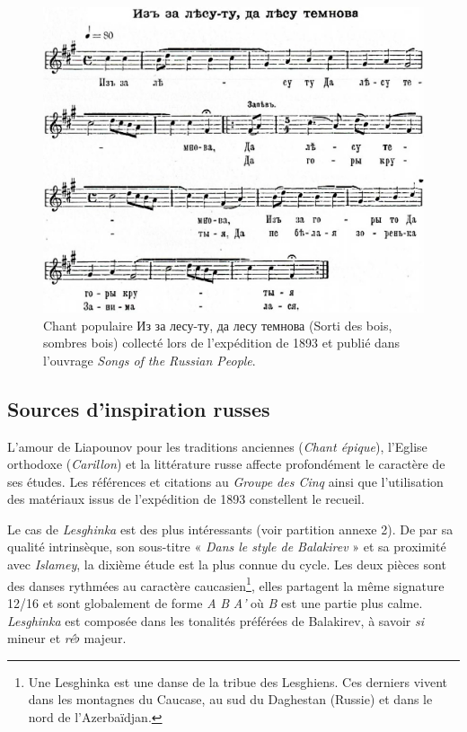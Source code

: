 \begin{figure}[!ht]
  \begin{bigcenter}
    \includegraphics[width=12.75cm, keepaspectratio]{woods.png}
  \end{bigcenter}
  \caption{\label{woods}Chant populaire \foreignlanguage{russian}{Из за лесу-ту, да лесу темнова} (Sorti des bois, sombres bois) collecté lors de l'expédition de 1893 et publié dans l'ouvrage \emph{Songs of the Russian People}.}
\end{figure}

\subsection{Sources d'inspiration russes}

L'amour de Liapounov pour les traditions anciennes (\emph{Chant épique}), l'Eglise orthodoxe (\emph{Carillon}) et la littérature russe affecte profondément le caractère de ses études. Les références et citations au \emph{Groupe des Cinq} ainsi que l'utilisation des matériaux issus de l'expédition de 1893 constellent le recueil. 

Le cas de \emph{Lesghinka} est des plus intéressants (voir partition annexe 2). De par sa qualité intrinsèque, son sous-titre « \emph{Dans le style de Balakirev} » et sa proximité avec \emph{Islamey}, la dixième étude est la plus connue du cycle. Les deux pièces sont des danses rythmées au caractère caucasien\footnote{Une Lesghinka est une danse de la tribue des Lesghiens. Ces derniers vivent dans les montagnes du Caucase, au sud du Daghestan (Russie) et dans le nord de l'Azerbaïdjan.}, elles partagent la même signature 12/16 et sont globalement de forme \emph{A} \emph{B} \emph{A'} où \emph{B} est une partie plus calme. \emph{Lesghinka} est composée dans les tonalités préférées de Balakirev, à savoir \emph{si} mineur et \emph{ré}$\flat$ majeur.

